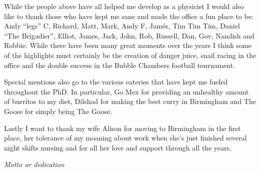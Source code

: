 While the people above have all helped me develop as a physicist I would also like to thank those who have kept me sane and made the office a fun place to be: Andy ``legs'' C, Richard, Matt, Mark, Andy F, Jam\'{e}s, Tim Tim Tim, Daniel ``The Brigadier'', Elliot, James, Jack, John, Rob, Russell, Dan, Gov, Nandish and Robbie. While there have been many great moments over the years I think some of the highlights must certainly be the creation of danger juice, snail racing in the office and the double success in the Bubble Chambers football tournament. 

Special mentions also go to the various eateries that have kept me fueled throughout the PhD. In particular, Go Mex for providing an unhealthy amount of burritos to my diet, Dilshad for making the best curry in Birmingham and The Goose for simply being The Goose.

Lastly I want to thank my wife Alison for moving to Birmingham in the first place, her tolerance of my moaning about work when she's just finished several night shifts nursing and for all her love and support through all the years. 
%
\cleardoublepage
~
\vspace*{\fill}
\begin{center}
  \emph{Motto or dedication}
\end{center}
\vspace*{\fill}
\cleardoublepage

